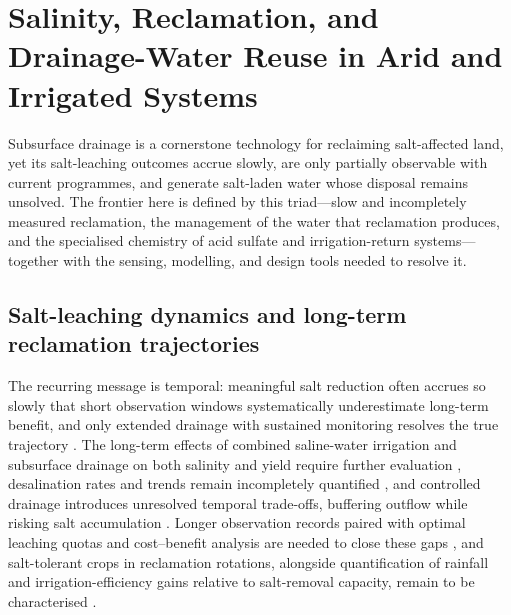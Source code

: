 \documentclass[11pt]{article}
\begin{document}
\section*{Salinity, Reclamation, and Drainage-Water Reuse in Arid and Irrigated Systems}

Subsurface drainage is a cornerstone technology for reclaiming salt-affected
land, yet its salt-leaching outcomes accrue slowly, are only partially
observable with current programmes, and generate salt-laden water whose disposal
remains unsolved. The frontier here is defined by this triad---slow and
incompletely measured reclamation, the management of the water that reclamation
produces, and the specialised chemistry of acid sulfate and irrigation-return
systems---together with the sensing, modelling, and design tools needed to
resolve it.

\subsection{Salt-leaching dynamics and long-term reclamation trajectories}

The recurring message is temporal: meaningful salt reduction often accrues so
slowly that short observation windows systematically underestimate long-term
benefit, and only extended drainage with sustained monitoring resolves the true
trajectory \parencite{Almen2021,Daigh2025}. The long-term effects of combined
saline-water irrigation and subsurface drainage on both salinity and yield
require further evaluation \parencite{Feng2017,Feng2021}, desalination rates and
trends remain incompletely quantified \parencite{Guo2024b,Yao2024}, and
controlled drainage introduces unresolved temporal trade-offs, buffering
outflow while risking salt accumulation
\parencite{Jouni2018,Lu2019,Islam2025,Heng2021}. Longer observation records
paired with optimal leaching quotas and cost--benefit analysis are needed to
close these gaps \parencite{Guo2025}, and salt-tolerant crops in reclamation
rotations, alongside quantification of rainfall and irrigation-efficiency gains
relative to salt-removal capacity, remain to be characterised
\parencite{Qadir2001,Castanheira2010}.
\end{document}
